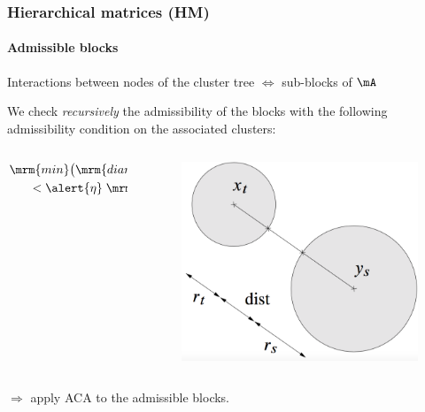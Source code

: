 \begin{frame}
\frametitle{Hierarchical matrices (HM)}
\framesubtitle{Admissible blocks }

\alert{Interactions between nodes} of the cluster tree $\Leftrightarrow$ \alert{sub-blocks} of $\mA$

\medskip
We check \emph{recursively} the admissibility of the blocks with the following \alert{admissibility condition} on the associated clusters:
\begin{columns}
\begin{column}{0.5\textwidth}
\begin{align*}
\mrm{min}\big( \mrm{diam}(\mB_{t}),\mrm{diam}(\mB_{s})\big) \\
< \alert{\eta}\;\mrm{dist}(\mrm{B}_{t},\mrm{B}_{s})
\end{align*}
\end{column}
\begin{column}{0.5\textwidth}
\begin{figure}
\includegraphics[width=0.9\columnwidth]{../images/cercles.png}
\end{figure}
\end{column}
\end{columns}

$\Rightarrow$ apply ACA to the admissible blocks.

\end{frame}


